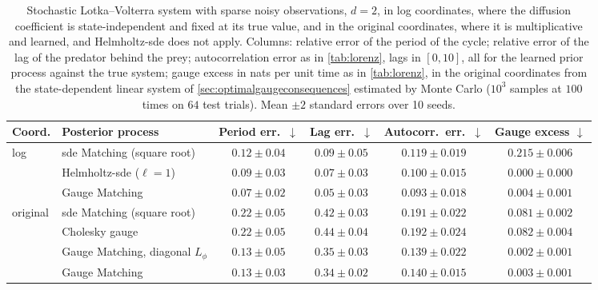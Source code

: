 \documentclass{article} %
\begin{document}
\begin{table}[t]
    \centering
    \caption{Stochastic Lotka--Volterra system with sparse noisy observations, $d = 2$, in log coordinates, where the diffusion coefficient is state-independent and fixed at its true value, and in the original coordinates, where it is multiplicative and learned, and Helmholtz-\gls{sde} does not apply. Columns: relative error of the period of the cycle; relative error of the lag of the predator behind the prey; autocorrelation error as in \cref{tab:lorenz}, lags in $[0, 10]$, all for the learned prior process against the true system; gauge excess in nats per unit time as in \cref{tab:lorenz}, in the original coordinates from the state-dependent linear system of \cref{sec:optimalgaugeconsequences} estimated by Monte Carlo ($10^3$ samples at $100$ times on $64$ test trials). Mean $\pm 2$ standard errors over 10 seeds.}
    \label{tab:lv}
    \small
    \setlength{\tabcolsep}{4pt}
    \begin{tabular}{llcccc}
        \toprule
        Coord. & Posterior process & Period err.\ $\downarrow$ & Lag err.\ $\downarrow$ & Autocorr.\ err.\ $\downarrow$ & Gauge excess $\downarrow$ \\
        \midrule
        \multirow{3}{*}{log}
        & \gls{sde} Matching (square root) & $0.12 \pm 0.04$ & $0.09 \pm 0.05$ & $0.119 \pm 0.019$ & $0.215 \pm 0.006$ \\
        & Helmholtz-\gls{sde} ($\ell = 1$) & $0.09 \pm 0.03$ & $0.07 \pm 0.03$ & $0.100 \pm 0.015$ & $0.000 \pm 0.000$ \\
        & Gauge Matching & $0.07 \pm 0.02$ & $0.05 \pm 0.03$ & $0.093 \pm 0.018$ & $0.004 \pm 0.001$ \\
        \midrule
        \multirow{4}{*}{original}
        & \gls{sde} Matching (square root) & $0.22 \pm 0.05$ & $0.42 \pm 0.03$ & $0.191 \pm 0.022$ & $0.081 \pm 0.002$ \\
        & Cholesky gauge & $0.22 \pm 0.05$ & $0.44 \pm 0.04$ & $0.192 \pm 0.024$ & $0.082 \pm 0.004$ \\
        & Gauge Matching, diagonal $L_\phi$ & $0.13 \pm 0.05$ & $0.35 \pm 0.03$ & $0.139 \pm 0.022$ & $0.002 \pm 0.001$ \\
        & Gauge Matching & $0.13 \pm 0.03$ & $0.34 \pm 0.02$ & $0.140 \pm 0.015$ & $0.003 \pm 0.001$ \\
        \bottomrule
    \end{tabular}
\end{table}
\end{document}
